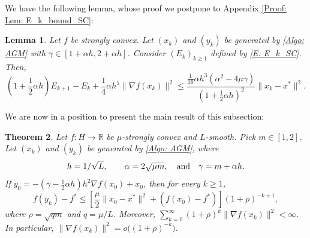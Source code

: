 \documentclass[pdflatex,sn-mathphys-num]{sn-jnl}
\theoremstyle{thmstyleone}
\newtheorem{theorem}{Theorem}
\newtheorem{lemma}[theorem]{Lemma}
\theoremstyle{thmstyletwo}
\theoremstyle{thmstylethree}
\newcommand{\qbox}[1]{\quad\hbox{#1}\quad}
\newcommand{\R}{\mathbb{R}}
\begin{document}
We have the following lemma, whose proof we postpone to Appendix \ref{Proof: Lem: E_k_bound_SC}:

\begin{lemma}\label{Lem: E_k_bound_SC}
Let $f$ be strongly convex. Let $(x_k)$ and $(y_k)$ be generated by \eqref{Algo: AGM} with $\gamma\in[1+\alpha h, 2+\alpha h]$. Consider $(E_k)_{k\ge 1}$ defined by \eqref{E: E_k_SC}. Then, 
$$ \left( 1 + \frac{1}{2}\alpha h \right)E_{k+1} - E_k + \frac{1}{4}\alpha h^5 \| \nabla f(x_k) \|^2 
\le \frac{\frac{1}{16}\alpha h^3 (\alpha^2-4\mu\gamma)}{\left( 1+\frac{1}{2}\alpha h \right)^2}\| x_k - x^* \|^2.  $$
\end{lemma}


We are now in a position to present the main result of this subsection:

\begin{theorem}\label{Thm: algo_SC_OGM}
Let $f:H\to\R$ be $\mu$-strongly convex and $L$-smooth. Pick $m\in[1,2]$. Let $(x_k)$ and $(y_k)$ be generated by \eqref{Algo: AGM}, where
$$ h=1/\sqrt{L},\qbox{}\alpha=2\sqrt{\mu m}, \qbox{and} \gamma=m+\alpha h. $$
If $y_0 = -\left(\gamma - \frac{1}{2}\alpha h \right)h^2 \nabla f(x_0)+x_0$, then for every $k\ge 1$,
$$ f(y_k) - f^* \le \left[ \frac{\mu}{2}\| x_0 - x^* \|^2 + \left( f(x_0) - f^* \right) \right] (1 + \rho)^{-k+1}, $$
where $\rho = \sqrt{qm}$ and $q=\mu/L$. Moreover, $ \sum_{k=0}^\infty (1+\rho)^k \| \nabla f(x_k) \|^2 < \infty $. In particular, $\| \nabla f(x_k) \|^2=o\big((1+\rho)^{-k}\big)$.
\end{theorem}
\end{document}
